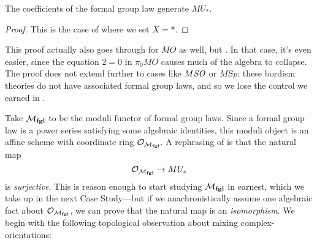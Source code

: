 \begin{corollary}\label{QuillenSurjective}
The coefficients of the formal group law generate \(MU_*\).
\end{corollary}
\begin{proof}
This is the case of  where we set \(X = *\).
\end{proof}

\begin{remark}
This proof actually also goes through for \(MO\) as well, but .  In that case, it's even easier, since the equation \(2 = 0\) in \(\pi_0 MO\) causes much of the algebra to collapse.  The proof does not extend further to cases like \(M\mathit{SO}\) or \(M\mathit{Sp}\): these bordism theories do not have associated formal group laws, and so we lose the control we earned in .
\end{remark}

Take \(\mathcal{M}_{\mathbf{fgl}}\) to be the moduli functor of formal group laws.  Since a formal group law is a power series satisfying some algebraic identities, this moduli object is an affine scheme with coordinate ring \(\mathcal{O}_{\mathcal{M}_{\mathbf{fgl}}}\).  A rephrasing of  is that the natural map \[\mathcal{O}_{\mathcal{M}_{\mathbf{fgl}}} \to MU_*\] is \emph{surjective}.  This is reason enough to start studying \(\mathcal{M}_{\mathbf{fgl}}\) in earnest, which we take up in the next Case Study---but if we anachronistically assume one algebraic fact about \(\mathcal{O}_{\mathcal{M}_{\mathbf{fgl}}}\), we can prove that the natural map is an \emph{isomorphism}.  We begin with the following topological observation about mixing complex-orientations:

